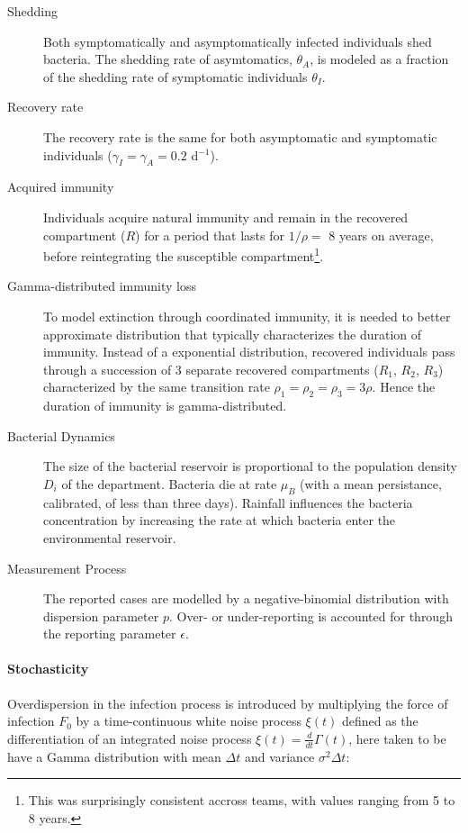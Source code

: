 \begin{description}
    \item[Shedding] Both symptomatically and asymptomatically infected individuals shed bacteria. The shedding rate of asymtomatics, $\theta_A$, is modeled as a fraction of the shedding rate of symptomatic individuals  $\theta_I$\cite{Kuhn:GlucoseNotRiceBased:2014}.
    \item[Recovery rate] The recovery rate is the same for both asymptomatic and symptomatic individuals ($\gamma_I=\gamma_A=0.2$ d$^{-1}$)\cite{Kaper:Cholera:1995, Codeco:EndemicEpidemicDynamics:2001}.
    \item[Acquired immunity] Individuals acquire natural immunity and remain in the recovered compartment ($R$) for a period that lasts for $1/\rho=$ 8 years on average, before reintegrating the susceptible compartment\footnote{This was surprisingly consistent accross teams, with values ranging from 5 to 8 years.}.
    \item[Gamma-distributed immunity loss] To model extinction through coordinated immunity, it is needed to better approximate distribution that typically characterizes the duration of immunity\cite{King:InapparentInfectionsCholera:2008}. Instead of a exponential distribution, recovered individuals pass through a succession of 3 separate recovered compartments ($R_1$, $R_2$, $R_3$) characterized by the same transition rate $\rho_1=\rho_2=\rho_3=3\rho$. Hence the duration of immunity is gamma-distributed.
    \item[Bacterial Dynamics] The size of the bacterial reservoir is proportional to the population density $D_i$ of the department. Bacteria die at rate $\mu_B$ (with a mean persistance, calibrated, of less than three days). Rainfall influences the bacteria concentration by increasing the rate at which bacteria enter the environmental reservoir.
    \item[Measurement Process] The reported cases are modelled by a negative-binomial distribution with dispersion parameter $p$. Over- or under-reporting is accounted for through the reporting parameter $\epsilon$.
\end{description}
    
    
\paragraph{Stochasticity} Overdispersion in the infection process is introduced by multiplying the force of infection $F_0$ by a time-continuous white noise process \(\xi(t)\) defined as the differentiation of an integrated noise process \(\xi(t) = \frac{d}{dt}\Gamma(t)\), here taken to be have a Gamma distribution with mean \(\Delta t\) and variance \(\sigma^2 \Delta t\)\cite[-3\baselineskip]{Breto:CompoundMarkovCounting:2011}:

